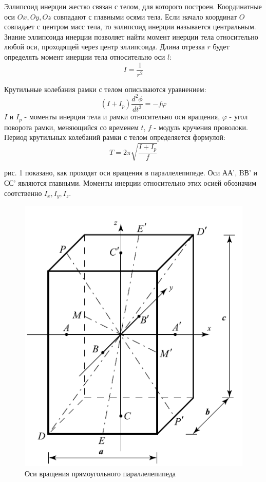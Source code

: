 \documentclass[a4paper, 10pt]{article}%
\begin{document}
Эллипсоид инерции жестко связан с телом, для которого построен. Координатные оси $Ox, Oy, Oz$ совпадают с главными осями тела. Если начало координат $O$ совпадает с центром масс тела, то эллипсоид инерции называется центральным. \\

Знание эллипсоида инерции позволяет найти момент инерции тела
относительно любой оси, проходящей через центр эллипсоида. Длина отрезка $r$ будет определять момент инерции тела относительно оси $l$:
\begin{equation}
    I = \frac{1}{r^2}
    \label{ссылка}
\end{equation}

Крутильные колебания рамки с телом описываются уравнением:
\begin{equation}
    (I+I_{p})\frac{d^2 \phi}{d t^2} = -f \varphi
\end{equation}
\quad{} $I$ и $I_{p}$ - моменты инерции тела и рамки относительно
 оси вращения, $\varphi$ - угол поворота рамки, меняющийся со
временем $t$, $f$ - модуль кручения проволоки. Период крутильных
 колебаний рамки с телом определяется формулой:
\begin{equation}
    T = 2\pi\sqrt{\frac{I+I_{p}}{f}}
\end{equation}

 рис. 1 показано, как проходят оси вращения в параллелепипеде.
 Оси АА', BВ' и СС' являются главными. Моменты инерции относительно
этих осией обозначим соотственно $I_{x}, I_{y}, I_{z}$.\\

 \begin{figure}[!h]
    \begin{center}
        \includegraphics[scale=1]{kyb}
        \caption{Оси вращения прямоугольного параллелепипеда}
        \label{graphic1}
    \end{center}
\end{figure}
\end{document}
